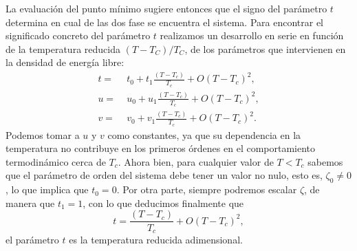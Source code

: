 La evaluación del punto mínimo sugiere entonces que el
signo del parámetro $t$ determina en cual de las dos fase se encuentra el
sistema. Para encontrar el significado concreto del parámetro $t$
realizamos un desarrollo en serie en función de la temperatura reducida
$(T-T_C)/T_C$, de los parámetros que intervienen en la densidad de energía libre:
\begin{align*}
t=&\; t_0+t_1\frac{(T-T_c)}{T_c}+O(T-T_c)^2,\\
u=&\; u_0+u_1\frac{(T-T_c)}{T_c}+O(T-T_c)^2,\\
v=&\; v_0+v_1\frac{(T-T_c)}{T_c}+O(T-T_c)^2.
\end{align*}
Podemos tomar a $u$ y $v$ como constantes, ya que su dependencia en la 
temperatura no contribuye en los primeros órdenes en el comportamiento
termodinámico cerca de $T_c$. Ahora bien,
para cualquier valor de $T\!<\!T_c$ sabemos que el parámetro de orden del
sistema debe tener un valor no nulo, esto es, $\zeta_0\!\neq\! 0$, lo que
implica que $t_0=0$. Por otra parte, siempre podremos escalar $\zeta$, 
de manera que $t_1=1$, con lo que deducimos finalmente que
\begin{equation*}
t=\frac{(T-T_c)}{T_c}+O(T-T_c)^2,
\end{equation*}
el parámetro $t$ es la temperatura reducida adimensional.



